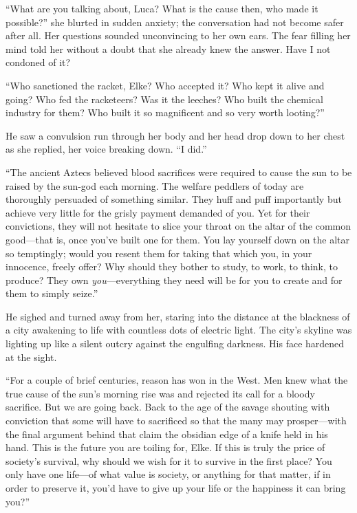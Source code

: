 ``What are you talking about, Luca? What is the cause then, who made it possible?'' she blurted in sudden anxiety; the conversation had not become safer after all. Her questions sounded unconvincing to her own ears. The fear filling her mind told her without a doubt that she already knew the answer. Have I not condoned of it?

``Who sanctioned the racket, Elke? Who accepted it? Who kept it alive and going? Who fed the racketeers? Was it the leeches? Who built the chemical industry for them? Who built it so magnificent and so very worth looting?''

He saw a convulsion run through her body and her head drop down to her chest as she replied, her voice breaking down. ``I did.''

``The ancient Aztecs believed blood sacrifices were required to cause the sun to be raised by the sun-god each morning. The welfare peddlers of today are thoroughly persuaded of something similar. They huff and puff importantly but achieve very little for the grisly payment demanded of you. Yet for their convictions, they will not hesitate to slice your throat on the altar of the common good---that is, once you've built one for them. You lay yourself down on the altar so temptingly; would you resent them for taking that which you, in your innocence, freely offer? Why should they bother to study, to work, to think, to produce? They own \emph{you}---everything they need will be for you to create and for them to simply seize.''

He sighed and turned away from her, staring into the distance at the blackness of a city awakening to life with countless dots of electric light. The city's skyline was lighting up like a silent outcry against the engulfing darkness. His face hardened at the sight.

``For a couple of brief centuries, reason has won in the West. Men knew what the true cause of the sun's morning rise was and rejected its call for a bloody sacrifice. But we are going back. Back to the age of the savage shouting with conviction that some will have to sacrificed so that the many may prosper---with the final argument behind that claim the obsidian edge of a knife held in his hand. This is the future you are toiling for, Elke. If this is truly the price of society's survival, why should we wish for it to survive in the first place? You only have one life---of what value is society, or anything for that matter, if in order to preserve it, you'd have to give up your life or the happiness it can bring you?''

